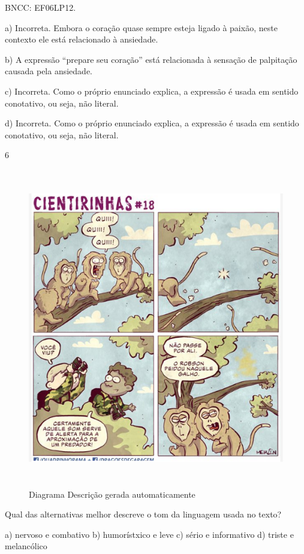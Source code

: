 BNCC: EF06LP12.

a) Incorreta. Embora o coração quase sempre esteja ligado à paixão,
neste contexto ele está relacionado à ansiedade.

b) A expressão ``prepare seu coração'' está relacionada à sensação de
palpitação causada pela ansiedade.

c) Incorreta. Como o próprio enunciado explica, a expressão é usada em
sentido conotativo, ou seja, não literal.

d) Incorreta. Como o próprio enunciado explica, a expressão é usada em
sentido conotativo, ou seja, não literal.

\num{6}

\begin{figure}
\centering
\includegraphics[width=5.19864in,height=5.50077in]{./imgSAEB_6_POR/media/image41.png}
\caption{Diagrama Descrição gerada automaticamente}
\end{figure}


Qual das alternativas melhor descreve o tom da linguagem usada no texto?

a) nervoso e combativo b) humorístxico e leve c) sério e informativo d)
triste e melancólico

